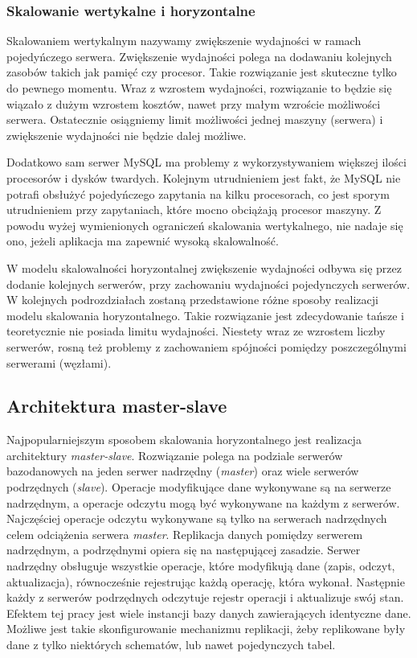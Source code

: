 \subsubsection{Skalowanie wertykalne i horyzontalne}
Skalowaniem wertykalnym nazywamy zwiększenie wydajności w ramach pojedyńczego serwera. Zwiększenie wydajności polega na dodawaniu kolejnych zasobów takich jak pamięć czy procesor. Takie rozwiązanie jest skuteczne tylko do pewnego momentu. Wraz z wzrostem wydajności, rozwiązanie to będzie się wiązało z dużym wzrostem kosztów, nawet przy małym wzroście możliwości serwera. Ostatecznie osiągniemy limit możliwości jednej maszyny (serwera) i zwiększenie wydajności nie będzie dalej możliwe. 

Dodatkowo sam serwer MySQL ma problemy z wykorzystywaniem większej ilości procesorów i dysków twardych. Kolejnym utrudnieniem jest fakt, że MySQL nie potrafi obsłużyć pojedyńczego zapytania na kilku procesorach, co jest sporym utrudnieniem przy zapytaniach, które mocno obciążają procesor maszyny. Z powodu wyżej wymienionych ograniczeń skalowania wertykalnego, nie nadaje się ono, jeżeli aplikacja ma zapewnić wysoką skalowalność.

W modelu skalowalności horyzontalnej zwiększenie wydajności odbywa się przez dodanie kolejnych serwerów, przy zachowaniu wydajności pojedynczych serwerów. W kolejnych podrozdziałach zostaną przedstawione różne sposoby realizacji modelu skalowania horyzontalnego. Takie rozwiązanie jest zdecydowanie tańsze i teoretycznie nie posiada limitu wydajności. Niestety wraz ze wzrostem liczby serwerów, rosną też problemy z zachowaniem spójności pomiędzy poszczególnymi serwerami (węzłami).


\subsection{Architektura master-slave}
Najpopularniejszym sposobem skalowania horyzontalnego jest realizacja architektury \textit{master-slave}. Rozwiązanie polega na podziale serwerów bazodanowych na jeden serwer nadrzędny (\textit{master}) oraz wiele serwerów podrzędnych (\textit{slave}). Operacje modyfikujące dane wykonywane są na serwerze nadrzędnym, a operacje odczytu mogą być wykonywane na każdym z serwerów. Najczęściej operacje odczytu wykonywane są tylko na serwerach nadrzędnych celem odciążenia serwera \textit{master}. Replikacja danych pomiędzy serwerem nadrzędnym, a podrzędnymi opiera się na następującej zasadzie. Serwer nadrzędny obsługuje wszystkie operacje, które modyfikują dane (zapis, odczyt, aktualizacja), równocześnie rejestrując każdą operację, która wykonał. Następnie każdy z serwerów podrzędnych odczytuje rejestr operacji i aktualizuje swój stan. Efektem tej pracy jest wiele instancji bazy danych zawierających identyczne dane. Możliwe jest takie skonfigurowanie mechanizmu replikacji, żeby replikowane były dane z tylko niektórych schematów, lub nawet pojedynczych tabel.


